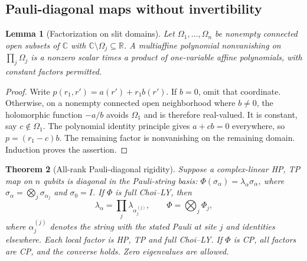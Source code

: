 \documentclass[reqno]{amsart}
\newtheorem{theorem}{Theorem}[section]
\newtheorem{lemma}[theorem]{Lemma}
\theoremstyle{definition}
\theoremstyle{remark}
\newcommand{\C}{\mathbb C}
\newcommand{\R}{\mathbb R}
\begin{document}
\subsection{Pauli-diagonal maps without invertibility}

\begin{lemma}[Factorization on slit domains]
\label{stat:slit-factorization}
Let \(\Omega_1,\ldots,\Omega_n\) be nonempty connected open
subsets of \(\C\) with \(\C\setminus\Omega_j\subseteq\R\).
A multiaffine polynomial nonvanishing on \(\prod_j\Omega_j\)
is a nonzero scalar times a product of one-variable affine
polynomials, with constant factors permitted.
\end{lemma}

\begin{proof}
Write \(p(r_1,r')=a(r')+r_1b(r')\).  If \(b=0\), omit that
coordinate.  Otherwise, on a nonempty connected open neighborhood
where \(b\ne0\), the holomorphic function \(-a/b\) avoids
\(\Omega_1\) and is therefore real-valued.  It is constant,
say \(c\notin\Omega_1\).  The polynomial identity principle
gives \(a+cb=0\) everywhere, so \(p=(r_1-c)b\).
The remaining factor is nonvanishing on the remaining domain.
Induction proves the assertion.
\end{proof}

\begin{theorem}[All-rank Pauli-diagonal rigidity]
\label{stat:pauli}
Suppose a complex-linear HP, TP map on \(n\) qubits is diagonal
in the Pauli-string basis:
\(\Phi(\sigma_\alpha)=\lambda_\alpha\sigma_\alpha\), where
\(\sigma_\alpha=\bigotimes_j\sigma_{\alpha_j}\) and
\(\sigma_0=I\).  If \(\Phi\) is full Choi--LY, then
\begin{equation}
 \lambda_\alpha=\prod_j\lambda_{\alpha_j^{(j)}},
 \qquad \Phi=\bigotimes_j\Phi_j,
 \label{stat:pauli-product}
\end{equation}
where \(\alpha_j^{(j)}\) denotes the string with the stated
Pauli at site \(j\) and identities elsewhere.  Each local
factor is HP, TP and full Choi--LY.  If \(\Phi\) is CP, all
factors are CP, and the converse holds.  Zero eigenvalues are
allowed.
\end{theorem}
\end{document}
